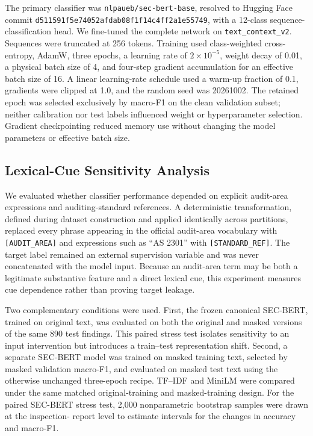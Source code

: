 \documentclass[11pt]{article}
\begin{document}
The primary classifier was \texttt{nlpaueb/sec-bert-base}, resolved to Hugging
Face commit \texttt{d511591f5e74052afdab08f1f14c4ff2a1e55749}, with a 12-class
sequence-classification head. We
fine-tuned the complete network on \texttt{text\_context\_v2}. Sequences were
truncated at 256 tokens. Training used class-weighted cross-entropy, AdamW,
three epochs, a learning rate of $2\times10^{-5}$, weight decay of 0.01, a
physical batch size of 4, and four-step gradient accumulation for an effective
batch size of 16. A linear learning-rate schedule used a warm-up fraction of
0.1, gradients were clipped at 1.0, and the random seed was 20261002. The retained
epoch was selected exclusively by macro-F1 on the clean validation subset; neither
calibration nor test labels influenced weight or hyperparameter selection.
Gradient checkpointing reduced memory use without changing the model parameters
or effective batch size.

\subsection{Lexical-Cue Sensitivity Analysis}

We evaluated whether classifier performance depended on explicit audit-area
expressions and auditing-standard references. A deterministic transformation,
defined during dataset construction and applied identically across partitions,
replaced every phrase appearing in the official audit-area vocabulary with
\texttt{[AUDIT\_AREA]} and expressions such as ``AS 2301'' with
\texttt{[STANDARD\_REF]}. The target label remained an external supervision
variable and was never concatenated with the model input. Because an audit-area
term may be both a legitimate substantive feature and a direct lexical cue, this
experiment measures cue dependence rather than proving target leakage.

Two complementary conditions were used. First, the frozen canonical SEC-BERT,
trained on original text, was evaluated on both the original and masked versions
of the same 890 test findings. This paired stress test isolates sensitivity to an
input intervention but introduces a train--test representation shift. Second, a
separate SEC-BERT model was trained on masked training text, selected by masked
validation macro-F1, and evaluated on masked test text using the otherwise
unchanged three-epoch recipe. TF--IDF and MiniLM were compared under the same
matched original-training and masked-training design. For the paired SEC-BERT
stress test, 2,000 nonparametric bootstrap samples were drawn at the inspection-
report level to estimate intervals for the changes in accuracy and macro-F1.
\end{document}
